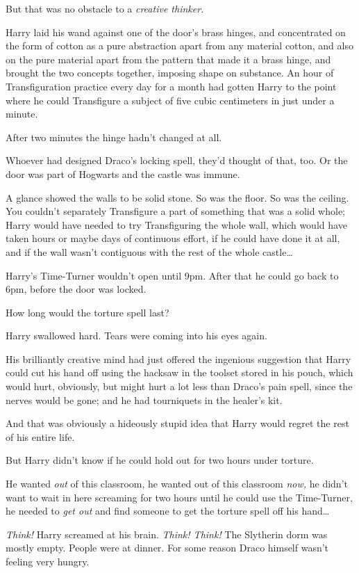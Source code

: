 But that was no obstacle to a \emph{creative thinker.}

Harry laid his wand against one of the door's brass hinges, and concentrated on 
the form of cotton as a pure abstraction apart from any material cotton, and 
also on the pure material apart from the pattern that made it a brass hinge, 
and brought the two concepts together, imposing shape on substance. An hour of 
Transfiguration practice every day for a month had gotten Harry to the point 
where he could Transfigure a subject of five cubic centimeters in just under a 
minute.

After two minutes the hinge hadn't changed at all.

Whoever had designed Draco's locking spell, they'd thought of that, too. Or the 
door was part of Hogwarts and the castle was immune.

A glance showed the walls to be solid stone. So was the floor. So was the 
ceiling. You couldn't separately Transfigure a part of something that was a 
solid whole; Harry would have needed to try Transfiguring the whole wall, which 
would have taken hours or maybe days of continuous effort, if he could have 
done it at all, and if the wall wasn't contiguous with the rest of the whole 
castle{\ldots}

Harry's Time-Turner wouldn't open until 9pm. After that he could go back to 
6pm, before the door was locked.

How long would the torture spell last?

Harry swallowed hard. Tears were coming into his eyes again.

His brilliantly creative mind had just offered the ingenious suggestion that 
Harry could cut his hand off using the hacksaw in the toolset stored in his 
pouch, which would hurt, obviously, but might hurt a lot less than Draco's pain 
spell, since the nerves would be gone; and he had tourniquets in the healer's 
kit.

And that was obviously a hideously stupid idea that Harry would regret the rest 
of his entire life.

But Harry didn't know if he could hold out for two hours under torture.

He wanted \emph{out} of this classroom, he wanted out of this classroom 
\emph{now,} he didn't want to wait in here screaming for two hours until he 
could use the Time-Turner, he needed to \emph{get out} and find someone to get 
the torture spell off his hand{\ldots}

\emph{Think!} Harry screamed at his brain. \emph{Think! Think!}
\sbreak
The Slytherin dorm was mostly empty. People were at dinner. For some reason 
Draco himself wasn't feeling very hungry.

